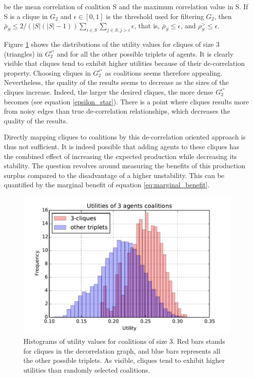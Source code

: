 \documentclass[conference]{IEEEtran}
\begin{document}
be the mean correlation of coalition S and the maximum correlation value in S. If S is a clique in $ G_{2} $ and $ \epsilon \in [0,1] $ is the threshold used for filtering $ G_{2} $, then $ \bar{\rho}_{S} \leq 2/(|S|(|S|-1)) \sum_{i \in S} \sum_{j \in S, j>i} \epsilon $, that is, $ \bar{\rho}_{S} \leq \epsilon $, and $ \rho_{S}^{>} \leq \epsilon $.

Figure \ref{fig:histo_cliques} shows the distributions of the utility values for cliques of size 3 (triangles) in $ G_{2}^{\epsilon^{\star}} $ and for all the other possible triplets of agents. It is clearly visible that cliques tend to exhibit higher utilities because of their de-correlation property. Choosing cliques in $ G_{2}^{\epsilon^{\star}} $ as coalitions seems therefore appealing. Nevertheless, the quality of the results seems to decrease as the sizes of the cliques increase. Indeed, the larger the desired cliques, the more dense $ G_{2}^{\epsilon^{\star}} $ becomes (see equation \ref{epsilon_star}). There is a point where cliques results more from noisy edges than true de-correlation relationships, which decreases the quality of the results.

Directly mapping cliques to coalitions by this de-correlation oriented approach is thus not sufficient. It is indeed possible that adding agents to these cliques has the combined effect of increasing the expected production while decreasing its stability. The question revolves around measuring the benefits of this production surplus compared to the disadvantage of a higher unstability. This can be quantified by the marginal benefit of equation \ref{eq:marginal_benefit}.

\begin{figure}
\includegraphics[scale=.6]{cliques_histo.pdf}
\caption{Histograms of utility values for coalitions of size 3. Red bars stands for cliques in the decorrelation graph, and blue bars represents all the other possible triplets. As visible, cliques tend to exhibit higher utilities than randomly selected coalitions.}
\label{fig:histo_cliques}
\end{figure}
\end{document}

